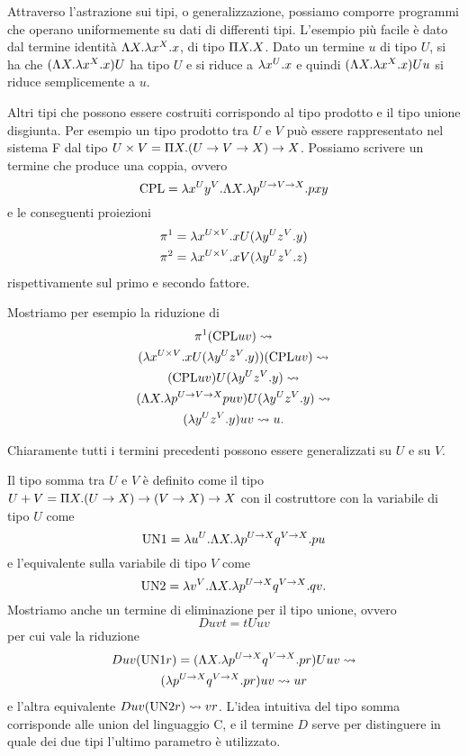\documentclass[]{marticle}
\begin{document}
Attraverso l'astrazione sui tipi, o generalizzazione, possiamo comporre
programmi che operano uniformemente su dati di differenti tipi. L'esempio pi\`u
facile \`e dato dal termine identit\`a $\L X. \l x^X. x$, di tipo $\P X. X$.
Dato un termine $u$ di tipo $U$, si ha che $(\L X. \l x^X. x)U$ ha tipo $U$ e si
riduce a $\l x^U.x$ e quindi $(\L X. \l x^X. x)Uu$ si riduce semplicemente a
$u$.

Altri tipi che possono essere costruiti corrispondo al tipo prodotto e il tipo
unione disgiunta. Per esempio un tipo prodotto tra $U$ e $V$ pu\`o essere
rappresentato nel sistema F dal tipo $U\times V = \P X. (U\rar V \rar X) \rar
X$. Possiamo scrivere un termine che produce una coppia, ovvero
\[
    \text{CPL} = \l x^U  y^V. \L X. \l p^{U \rar V\rar X}. pxy
\]
e le conseguenti proiezioni
\begin{gather*}
    \pi^1 = \l x^{U\times V}. xU(\l y^U z^V.y) \\
    \pi^2 = \l x^{U\times V}. xV(\l y^U z^V.z)
\end{gather*}
rispettivamente sul primo e secondo fattore.

Mostriamo per esempio la riduzione di 
\begin{gather*}
    \pi^1 (\text{CPL}uv) \conv \\
    (\l x^{U\times V}. xU(\l y^U z^V.y))(\text{CPL}uv) \conv \\
    (\text{CPL}uv)U (\l y^U z^V.y) \conv \\
    (\L X. \l p^{U\rar V \rar X} puv)U (\l y^U z^V.y)  \conv \\
    (\l y^U z^V.y)uv \conv u.
\end{gather*}

Chiaramente tutti i termini precedenti possono essere generalizzati su $U$ e su
$V$.

Il tipo somma tra $U$ e $V$ \`e definito come il tipo $U+V = \P X. (U\rar X)
\rar (V\rar X) \rar X$ con il costruttore con la variabile di tipo $U$ come 
\[
    \text{UN1} = \l u^U. \L X. \l p^{U\rar X} q^{V\rar X}. pu
\]
e l'equivalente sulla variabile di tipo $V$ come 
\[
    \text{UN2} = \l v^V. \L X. \l p^{U\rar X} q^{V\rar X}. qv.
\]
Mostriamo anche un termine di eliminazione per il tipo unione, ovvero
\[
    D uvt = tU uv
\]
per cui vale la riduzione
\begin{gather*}
    Duv(\text{UN1}r) = (\L X. \l p^{U\rar X}q^{V\rar X}. pr) U uv \conv \\
    (\l p^{U\rar X}q^{V\rar X}. pr)uv \conv u r
\end{gather*}
e l'altra equivalente $Duv(\text{UN2}r) \conv vr$.
L'idea intuitiva del tipo somma corrisponde alle union del linguaggio C, e il
termine $D$ serve per distinguere in quale dei due tipi l'ultimo parametro \`e
utilizzato.
\end{document}
